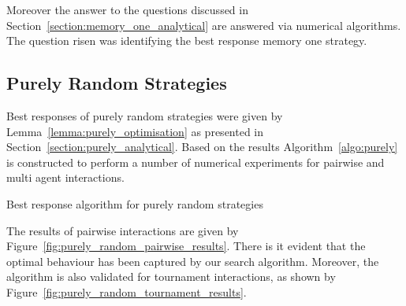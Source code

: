 \documentclass[10pt]{article}
\makeatletter
\def\BState{\State\hskip-\ALG@thistlm}
\makeatother
\begin{document}
Moreover the answer to the questions discussed in Section~\ref{section:memory_one_analytical}
are answered via numerical algorithms. The question risen was identifying the best
response memory one strategy.

\subsection{Purely Random Strategies}

Best responses of purely random strategies were given by Lemma~\ref{lemma:purely_optimisation}
as presented in Section~\ref{section:purely_analytical}. Based on the results
Algorithm~\ref{algo:purely} is constructed to perform a number of numerical experiments
for pairwise and multi agent interactions.

\begin{algorithm}
    \caption{Best response algorithm for purely random strategies}\label{algo:purely}
    \end{algorithm}

The results of pairwise interactions are given by Figure~\ref{fig:purely_random_pairwise_results}.
There is it evident that the optimal behaviour has been captured by our search algorithm.
Moreover, the algorithm is also validated for tournament interactions, as shown
by Figure~\ref{fig:purely_random_tournament_results}.
\end{document}
